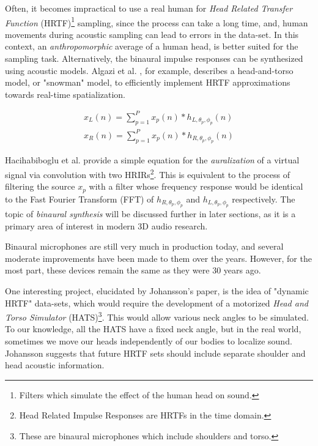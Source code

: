 Often, it becomes impractical to use a real human for \textit{Head Related Transfer Function} (HRTF)\footnote{Filters which simulate the effect of the human head on sound.} sampling, since the process can take a long time, and, human movements during acoustic sampling can lead to errors in the data-set. In this context, an \textit{anthropomorphic} average of a human head, is better suited for the sampling task. Alternatively, the binaural impulse responses can be synthesized using acoustic models. Algazi et al. \cite{algazi2002use}, for example, describes a head-and-torso model, or "snowman" model, to efficiently implement HRTF approximations towards real-time spatialization. 

\begin{equation} \label{eq:conv-hrir}
\begin{array}{l}
x_{L}(n)=\sum_{p=1}^{P} x_{p}(n) * h_{L, \theta_{p}, \phi_{p}}(n) \\
x_{R}(n)=\sum_{p=1}^{P} x_{p}(n) * h_{R, \theta_{p}, \phi_{p}}(n)
\end{array}
\end{equation}

Hacihabiboglu et al. \cite{hacihabiboglu2017perceptual} provide a simple equation for the \textit{auralization} of a virtual signal via convolution with two HRIRs\footnote{Head Related Impulse Responses are HRTFs in the time domain.}. This is equivalent to the process of filtering the source $x_p$ with a filter whose frequency response would be identical to the Fast Fourier Transform (FFT) of $h_{R, \theta_{p}, \phi_{p}}$ and $h_{L, \theta_{p}, \phi_{p}}$ respectively. The topic of \textit{binaural synthesis} will be discussed further in later sections, as it is a primary area of interest in modern 3D audio research.

Binaural microphones are still very much in production today, and several moderate improvements have been made to them over the years. However, for the most part, these devices remain the same as they were 30 years ago. 

One interesting project, elucidated by Johansson's \cite{johansson2019vr} paper, is the idea of "dynamic HRTF" data-sets, which would require the development of a motorized \textit{Head and Torso Simulator} (HATS)\footnote{These are binaural microphones which include shoulders and torso.}. This would allow various neck angles to be simulated. To our knowledge, all the HATS have a fixed neck angle, but in the real world, sometimes we move our heads independently of our bodies to localize sound. Johansson suggests that future HRTF sets should include separate shoulder and head acoustic information.

